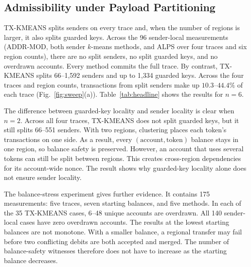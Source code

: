\documentclass[conference,letterpaper]{IEEEtran}
\begin{document}
\subsection{Admissibility under Payload Partitioning}

TX-KMEANS splits senders on every trace and, when the number of regions is
larger, it also splits guarded keys. Across the 96 sender-local measurements
(ADDR-MOD, both sender $k$-means methods, and ALPS over four traces and six
region counts), there are no split senders, no split guarded keys, and no
overdrawn accounts. Every method commits the full trace. By contrast,
TX-KMEANS splits 66--1{,}592 senders and up to 1{,}334 guarded keys. Across the
four traces and region counts, transactions from split senders make up
$10.3$--$44.4\%$ of each trace (Fig.~\ref{fig:sweep}(a)). Table~\ref{tab:headline}
shows the results for $n=6$.

The difference between guarded-key locality and sender locality is clear
when $n=2$. Across all four traces, TX-KMEANS does not split guarded keys, but
it still splits 66--551 senders. With two regions, clustering places each
token's transactions on one side. As a result, every
$(\text{account},\text{token})$ balance stays in one region, so balance safety
is preserved. However, an account that uses several tokens can still be split
between regions. This creates cross-region dependencies for its account-wide
nonce. The result shows why guarded-key locality alone does not ensure sender
locality.

The balance-stress experiment gives further evidence. It contains 175
measurements: five traces, seven starting balances, and five methods. In each
of the 35 TX-KMEANS cases, 6--48 unique accounts are overdrawn. All 140
sender-local cases have zero overdrawn accounts. The results at the lowest
starting balances are not monotone. With a smaller balance, a regional
transfer may fail before two conflicting debits are both accepted and merged.
The number of balance-safety witnesses therefore does not have to increase as
the starting balance decreases.
\end{document}
